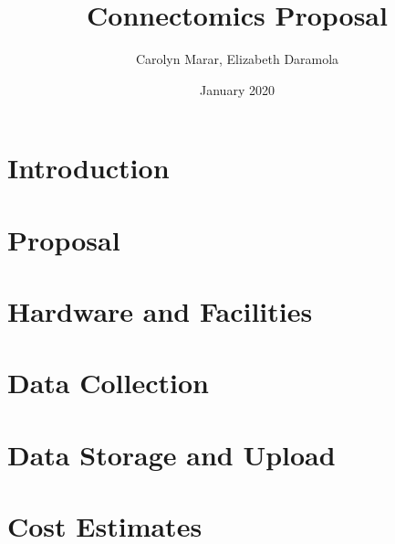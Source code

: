 \documentclass{article}
\title{Connectomics Proposal}
\author{Carolyn Marar, Elizabeth Daramola }
\date{January 2020}
\begin{document}
\maketitle

\section{Introduction}

\section{Proposal}

\section{Hardware and Facilities}

\section{Data Collection}

\section{Data Storage and Upload}

\section{Cost Estimates}
\end{document}
